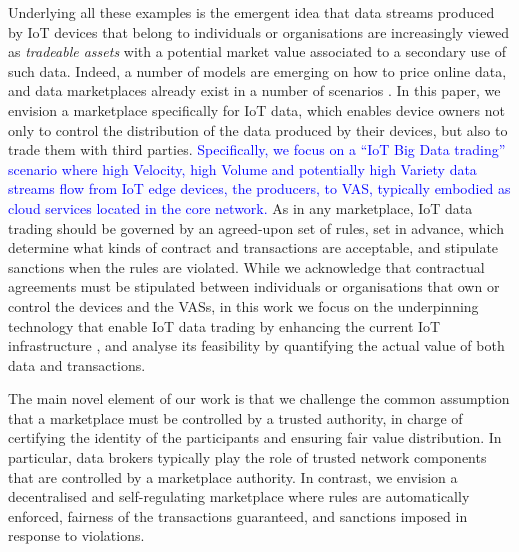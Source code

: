 \documentclass[chi_draft]{sigchi}
\begin{document}
Underlying all these examples is the emergent idea that data streams produced by IoT devices that belong to individuals or organisations are increasingly viewed as \textit{tradeable assets} with a potential market value associated to a secondary use of such data.
%
Indeed,  a number of models are emerging on how to price online data, and data marketplaces already exist in a number of scenarios .
%
In this paper, %
we envision a marketplace specifically for IoT data, which enables device owners not only to control the distribution of the data produced by their devices, but also to trade them with third parties.
%
\textcolor{blue}{Specifically, we focus on a ``IoT Big Data trading'' scenario where high Velocity, high Volume and potentially high Variety data streams flow from IoT edge devices, the producers, to VAS, typically embodied as cloud services located in the core network.}
As in any marketplace, IoT data trading should be governed by an agreed-upon set of rules, set in advance, which determine what kinds of contract and transactions are acceptable, and stipulate sanctions when the rules are violated.
%
While we acknowledge that contractual agreements must be stipulated between %
individuals or organisations that own or control the devices and the VASs, in this work we %
focus on the underpinning technology that %
enable IoT data trading by enhancing the current IoT infrastructure%
, and analyse its feasibility by quantifying the actual value of both data and transactions. 

The main novel element of our work is that we challenge the common assumption that a marketplace must be controlled by a trusted authority, in charge of certifying the identity of the participants%
 and ensuring %
fair value distribution. 
In particular, data brokers typically play the role of trusted network components that are controlled by a marketplace authority.
%
In contrast, we envision a decentralised and self-regulating marketplace where rules are automatically enforced, fairness of the transactions guaranteed, and sanctions imposed in response to violations.
%

\end{document}
